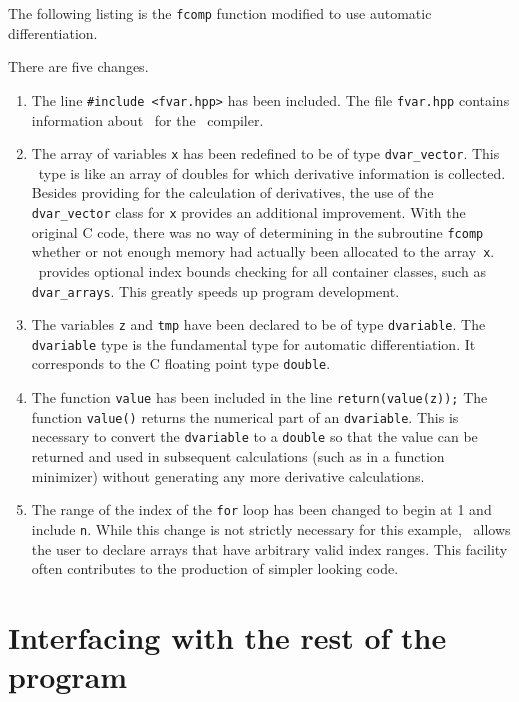 \documentclass{admbmanual}
\begin{document}
The following listing is the \texttt{fcomp} function modified to use automatic
differentiation.

\noindent There are five changes.
\begin{enumerate}
  \item The line \texttt{\#include <fvar.hpp>} has been included. The file
  \texttt{fvar.hpp} contains information about \scAD\ for the \cplus\ compiler.

  \item The array of variables \texttt{x} has been redefined to be of type
  \texttt{dvar\_vector}. This \scAD\ type is like an array of doubles for which
  derivative information is collected. Besides providing for the calculation of
  derivatives, the use of the \texttt{dvar\_vector} class for \texttt{x}
  provides an additional improvement. With the original C code, there was no way
  of determining in the subroutine \texttt{fcomp} whether or not enough memory
  had actually been allocated to the array~\texttt{x}. \scAD\ provides optional
  index bounds checking for all container classes, such as
  \texttt{dvar\_arrays}. This greatly speeds up program development.

  \item The variables \texttt{z} and \texttt{tmp} have been declared to be of
  type \texttt{dvariable}. The \texttt{dvariable} type is the fundamental type
  for automatic differentiation. It corresponds to the C floating point type
  \texttt{double}.

  \item The function \texttt{value} has been included in the line
  \texttt{return(value(z));} The function \texttt{value()} returns the numerical
  part of an \texttt{dvariable}. This is necessary to convert the
  \texttt{dvariable} to a \texttt{double} so that the value can be returned and
  used in subsequent calculations (such as in a function minimizer) without
  generating any more derivative calculations.

  \item The range of the index of the \texttt{for} loop has been changed to
  begin at 1 and include \texttt{n}. While this change is not strictly necessary
  for this example, \scAD\ allows the user to declare arrays that have arbitrary
  valid index ranges. This facility often contributes to the production of
  simpler looking code.
\end{enumerate}

\section{Interfacing with the rest of the program}
\end{document}
